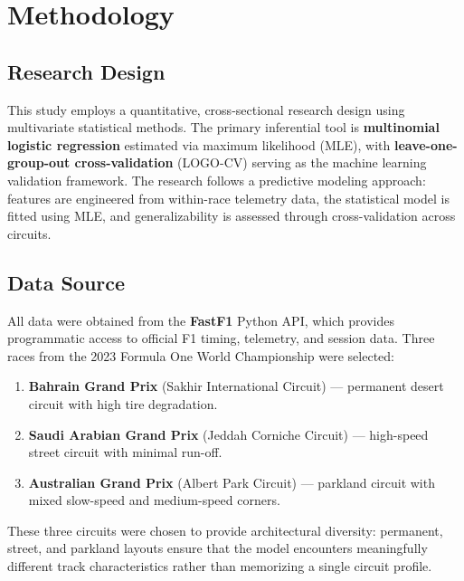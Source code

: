 \section{Methodology}

\subsection{Research Design}

This study employs a quantitative, cross-sectional research design using
multivariate statistical methods. The primary inferential tool is
\textbf{multinomial logistic regression} estimated via maximum likelihood
(MLE), with \textbf{leave-one-group-out cross-validation} (LOGO-CV) serving
as the machine learning validation framework. The research follows a
predictive modeling approach: features are engineered from within-race
telemetry data, the statistical model is fitted using MLE, and
generalizability is assessed through cross-validation across circuits.

\subsection{Data Source}

All data were obtained from the \textbf{FastF1} Python API, which provides
programmatic access to official F1 timing, telemetry, and session data. Three
races from the 2023 Formula One World Championship were selected:

\begin{enumerate}
  \item \textbf{Bahrain Grand Prix} (Sakhir International Circuit) ---
    permanent desert circuit with high tire degradation.
  \item \textbf{Saudi Arabian Grand Prix} (Jeddah Corniche Circuit) ---
    high-speed street circuit with minimal run-off.
  \item \textbf{Australian Grand Prix} (Albert Park Circuit) ---
    parkland circuit with mixed slow-speed and medium-speed corners.
\end{enumerate}

These three circuits were chosen to provide architectural diversity:
permanent, street, and parkland layouts ensure that the model encounters
meaningfully different track characteristics rather than memorizing a single
circuit profile.

